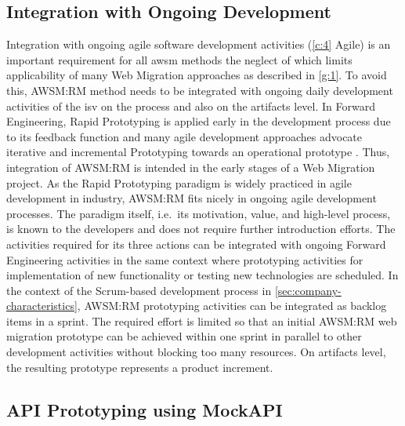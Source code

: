 \vspace{-10pt}
\hypertarget{sec:rwmp.integration}{%
\subsection{Integration with Ongoing Development}\label{sec:rwmp.integration}}
\vspace{10pt}

Integration with ongoing agile software development activities (\cref{c:4} Agile) is an important requirement for all \gls{awsm} methods the neglect of which limits applicability of many \gls{Web Migration} approaches as described in \cref{g:1}.
To avoid this, AWSM:RM method needs to be integrated with ongoing daily development activities of the \gls{isv} on the process and also on the artifacts level.
In \gls{Forward Engineering}, \gls{Rapid Prototyping} is applied early in the development process due to its feedback function and many agile development approaches advocate iterative and incremental \gls{Prototyping} towards an operational prototype  \autocite{Rivero2013MockupDD,Rivero2013,Rivero2014Electra}.
Thus, integration of AWSM:RM is intended in the early stages of a \gls{Web Migration} project.
As the \gls{Rapid Prototyping} paradigm is widely practiced in agile development in industry, AWSM:RM fits nicely in ongoing agile development processes.
The paradigm itself, i.e.~its motivation, value, and high-level process, is known to the developers and does not require further introduction efforts.
The activities required for its three actions can be integrated with ongoing \gls{Forward Engineering} activities in the same context where prototyping  activities for implementation of new functionality or testing new technologies are scheduled.
In the context of the Scrum-based development process in \cref{sec:company-characteristics}, AWSM:RM prototyping activities can be integrated as backlog items in a sprint.
The required effort is limited so that an initial AWSM:RM \gls{web migration prototype} can be achieved within one sprint in parallel to other development activities without blocking too many resources.
On \glspl{artifact} level, the resulting prototype represents a product increment.

\vspace{-10pt}
\hypertarget{sec:mockapi}{%
\subsection{API Prototyping using MockAPI}\label{sec:mockapi}}
\vspace{10pt}

